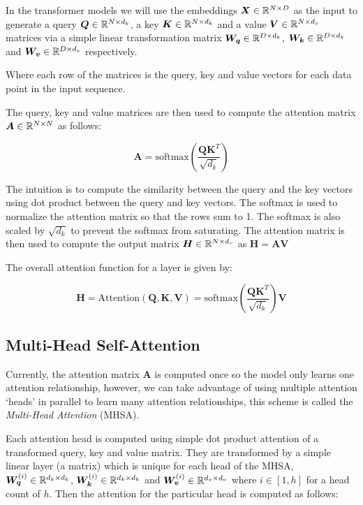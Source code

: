 \documentclass[../../main.tex]{subfiles}
\begin{document}
In the transformer models we will use the embeddings $\bm{X} \in \mathbb{R}^{N \times D}$ as the input to generate a query $\bm{Q} \in \mathbb{R}^{N \times d_k}$, a key $\bm{K} \in \mathbb{R}^{N \times d_k}$ and a value $\bm{V} \in \mathbb{R}^{N \times d_v}$ matrices via a simple linear transformation matrix $\bm{W_q} \in \mathbb{R}^{D \times d_k}$, $\bm{W_k} \in \mathbb{R}^{D \times d_k}$ and $\bm{W_v} \in \mathbb{R}^{D \times d_v}$ respectively. 

Where each row of the matrices is the query, key and value vectors for each data point in the input sequence. 

The query, key and value matrices are then used to compute the attention matrix $\bm{A} \in \mathbb{R}^{N \times N}$ as follows:

\begin{equation}
    \bm{A} = \text{softmax}\left(\frac{\bm{Q}\bm{K}^T}{\sqrt{d_k}}\right)
\end{equation}

\noi The intuition is to compute the similarity between the query and the key vectors using dot product between the query and key vectors. The softmax is used to normalize the attention matrix so that the rows sum to 1. The softmax is also scaled by $\sqrt{d_k}$ to prevent the softmax from saturating. The attention matrix is then used to compute the output matrix $\bm{H} \in \mathbb{R}^{N \times d_v}$ as $\bm{H} = \bm{A}\bm{V}$

The overall attention function for a layer is given by:

\begin{equation}
    \bm{H} =\text{Attention}(\bm{Q}, \bm{K}, \bm{V}) = \text{softmax}\left(\frac{\bm{Q}\bm{K}^T}{\sqrt{d_k}}\right)\bm{V}
\end{equation}

\subsection{Multi-Head Self-Attention}

Currently, the attention matrix $\bm{A}$ is computed once so the model only learns one attention relationship, however, we can take advantage of using multiple attention `heads' in parallel to learn many attention relationships, this scheme is called the \emph{Multi-Head Attention} (MHSA). 

Each attention head is computed using simple dot product attention of a transformed query, key and value matrix. They are transformed by a simple linear layer (a matrix) which is unique for each head of the MHSA, $\bm{W_q}^{(i)} \in \mathbb{R}^{d_k \times d_k}$, $\bm{W_k}^{(i)} \in \mathbb{R}^{d_k \times d_k}$ and $\bm{W_v}^{(i)} \in \mathbb{R}^{d_v \times d_v}$ where $i \in [1, h]$ for a head count of $h$. Then the attention for the particular head is computed as follows:
\end{document}
